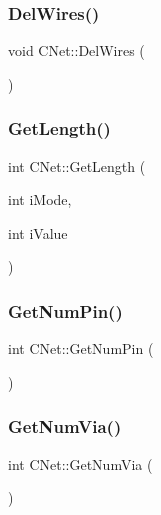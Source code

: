 \mbox{\label{classCNet_a5836b8ada69984cf346e6a41bd536b86}} 
\subsubsection{\texorpdfstring{DelWires()}{DelWires()}}
{\footnotesize\ttfamily void C\+Net\+::\+Del\+Wires (\begin{DoxyParamCaption}{ }\end{DoxyParamCaption})}

\mbox{\label{classCNet_a8712e8f595e036e1e5c693100d071e38}} 
\subsubsection{\texorpdfstring{GetLength()}{GetLength()}}
{\footnotesize\ttfamily int C\+Net\+::\+Get\+Length (\begin{DoxyParamCaption}\item[{int}]{i\+Mode,  }\item[{int}]{i\+Value }\end{DoxyParamCaption})}

\mbox{\label{classCNet_a709f7e9718fa62118a55d8def2fd4e41}} 
\subsubsection{\texorpdfstring{GetNumPin()}{GetNumPin()}}
{\footnotesize\ttfamily int C\+Net\+::\+Get\+Num\+Pin (\begin{DoxyParamCaption}{ }\end{DoxyParamCaption})}

\mbox{\label{classCNet_abd9060bc972528e75eb26cabeceba261}} 
\subsubsection{\texorpdfstring{GetNumVia()}{GetNumVia()}}
{\footnotesize\ttfamily int C\+Net\+::\+Get\+Num\+Via (\begin{DoxyParamCaption}{ }\end{DoxyParamCaption})}

